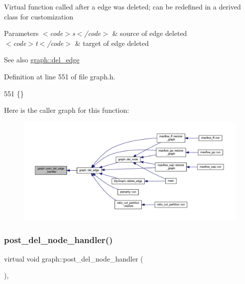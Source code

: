 Virtual function called after a edge was deleted; can be redefined in a derived class for customization


\begin{DoxyParams}{Parameters}
{\em $<$code$>$s$<$/code$>$} & source of edge deleted \\
\hline
{\em $<$code$>$t$<$/code$>$} & target of edge deleted \\
\hline
\end{DoxyParams}
\begin{DoxySeeAlso}{See also}
\mbox{\hyperlink{classgraph_ad9356508c49c542dfd4b7169297387c6}{graph\+::del\+\_\+edge}} 
\end{DoxySeeAlso}


Definition at line 551 of file graph.\+h.


\begin{DoxyCode}
551 \{\}
\end{DoxyCode}
Here is the caller graph for this function\+:
\nopagebreak
\begin{figure}[H]
\begin{center}
\leavevmode
\includegraphics[width=350pt]{classgraph_ab9ac8bcc7288986de69cd467beb33600_icgraph}
\end{center}
\end{figure}
\mbox{\label{classgraph_a4e08a559e3f1007a1a16a53c9a15cb0f}} 
\subsubsection{\texorpdfstring{post\+\_\+del\+\_\+node\+\_\+handler()}{post\_del\_node\_handler()}}
{\footnotesize\ttfamily virtual void graph\+::post\+\_\+del\+\_\+node\+\_\+handler (\begin{DoxyParamCaption}{ }\end{DoxyParamCaption})\hspace{0.3cm}{\ttfamily [inline]}, {\ttfamily [virtual]}}

